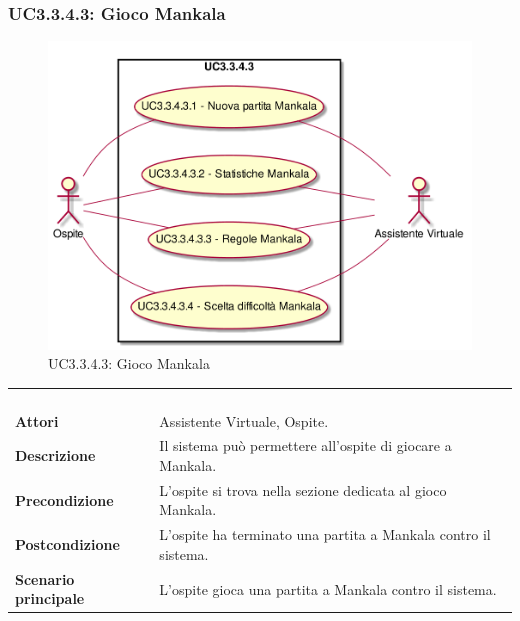 \newpage\subsubsection{UC3.3.4.3: Gioco Mankala}
\label{UC3.3.4.3}
\begin{figure}[h]
	\centering
	\includegraphics[width=\textwidth,height=\textheight,keepaspectratio]{images/UseCaseUC3343.png}
	\caption{UC3.3.4.3: Gioco Mankala}
\end{figure}
\begin{longtable}{l|p{10cm}}
	\rowcolor[gray]{0.8} \multicolumn{2}{c}{} \\
	\rowcolor[gray]{0.8} \multicolumn{2}{c}{\textbf{UC3.3.4.3 - Gioco Mankala}} \\
	\rowcolor[gray]{0.8} \multicolumn{2}{c}{} \\
	\hline
	&\\
	\textbf{Attori} & Assistente Virtuale, Ospite.\\[7pt]
	\textbf{Descrizione} & Il sistema può permettere all'ospite di giocare a Mankala.\\[7pt]
	\textbf{Precondizione} & L'ospite si trova nella sezione dedicata al gioco Mankala.\\[7pt]
	\textbf{Postcondizione} & L'ospite ha terminato una partita a Mankala contro il sistema.\\[7pt]
	\textbf{Scenario principale} &L'ospite gioca una partita a Mankala contro il sistema.\\[7pt]\hline
\end{longtable}

